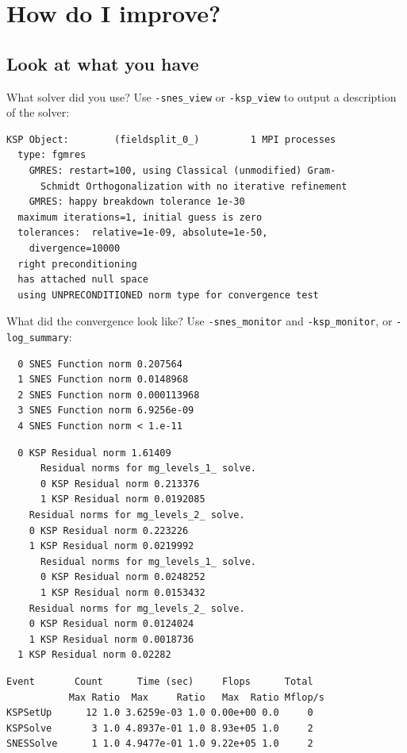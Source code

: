 \documentclass[dvipsnames]{beamer}
\begin{document}
\section{How do I improve?}
\subsection{Look at what you have}
%
\begin{frame}[fragile]{What solver did you use?}
Use \verb|-snes_view| or \verb|-ksp_view| to output a description of the solver:
\small
\begin{verbatim}
KSP Object:        (fieldsplit_0_)         1 MPI processes
  type: fgmres
    GMRES: restart=100, using Classical (unmodified) Gram-
      Schmidt Orthogonalization with no iterative refinement
    GMRES: happy breakdown tolerance 1e-30
  maximum iterations=1, initial guess is zero
  tolerances:  relative=1e-09, absolute=1e-50,
    divergence=10000
  right preconditioning
  has attached null space
  using UNPRECONDITIONED norm type for convergence test
\end{verbatim}
\end{frame}
%
\begin{frame}[fragile]{What did the convergence look like?}
Use \verb|-snes_monitor| and \verb|-ksp_monitor|, or \verb|-log_summary|:
\small
\begin{overprint}
\smallskip
\begin{verbatim}
  0 SNES Function norm 0.207564 
  1 SNES Function norm 0.0148968 
  2 SNES Function norm 0.000113968 
  3 SNES Function norm 6.9256e-09 
  4 SNES Function norm < 1.e-11
\end{verbatim}
\smallskip
\begin{verbatim}
  0 KSP Residual norm 1.61409 
      Residual norms for mg_levels_1_ solve.
      0 KSP Residual norm 0.213376 
      1 KSP Residual norm 0.0192085 
    Residual norms for mg_levels_2_ solve.
    0 KSP Residual norm 0.223226 
    1 KSP Residual norm 0.0219992 
      Residual norms for mg_levels_1_ solve.
      0 KSP Residual norm 0.0248252 
      1 KSP Residual norm 0.0153432 
    Residual norms for mg_levels_2_ solve.
    0 KSP Residual norm 0.0124024 
    1 KSP Residual norm 0.0018736 
  1 KSP Residual norm 0.02282 
\end{verbatim}
\smallskip
\begin{verbatim}
Event       Count      Time (sec)     Flops      Total
           Max Ratio  Max     Ratio   Max  Ratio Mflop/s
KSPSetUp      12 1.0 3.6259e-03 1.0 0.00e+00 0.0     0
KSPSolve       3 1.0 4.8937e-01 1.0 8.93e+05 1.0     2
SNESSolve      1 1.0 4.9477e-01 1.0 9.22e+05 1.0     2
\end{verbatim}
\end{overprint}
\end{frame}
\end{document}
